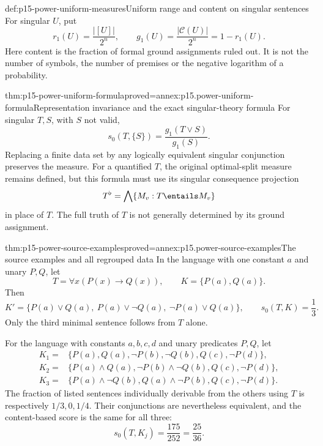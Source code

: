 \begin{hbdefinition}{def:p15-power-uniform-measures}{Uniform range and content on singular sentences}
For singular \(U\), put
\[
 r_1(U)=\frac{|[U]|}{2^n},\qquad
 g_1(U)=\frac{|\mathcal C(U)|}{2^n}=1-r_1(U).
\]
Here content is the fraction of formal ground
assignments ruled out. It is not the number
of symbols, the number of premises or the
negative logarithm of a probability.
\end{hbdefinition}

\begin{hbtheorem}{thm:p15-power-uniform-formula}{proved=annex:p15.power-uniform-formula}{Representation invariance and the exact singular-theory formula}
For singular \(T,S\), with \(S\) not valid,
\[
                  s_0(T,\{S\})
                     =\frac{g_1(T\lor S)}{g_1(S)} .
\]
Replacing a finite data set by any logically
equivalent singular conjunction preserves
the measure. For a quantified \(T\), the
original optimal-split measure remains
defined, but this formula must use its
singular consequence projection
\[
              T^\flat=\bigwedge\{M_v:T\entails M_v\}
\]
in place of \(T\). The full truth of \(T\)
is not generally determined by its ground
assignment.
\end{hbtheorem}

\begin{hbtheorem}{thm:p15-power-source-examples}{proved=annex:p15.power-source-examples}{The source examples and all regrouped data}
In the language with one constant \(a\)
and unary \(P,Q\), let
\[
                 T=\forall x(P(x)\to Q(x)),
                 \qquad K=\{P(a),Q(a)\}.
\]
Then
\[
 K'=\{P(a)\lor Q(a),\ P(a)\lor\neg Q(a),\
                              \neg P(a)\lor Q(a)\},
 \qquad s_0(T,K)=\frac13 .
\]
Only the third minimal sentence follows
from \(T\) alone.

For the language with constants \(a,b,c,d\)
and unary predicates \(P,Q\), let
\[
\begin{split}
 K_1={}&\{P(a),Q(a),\neg P(b),\neg Q(b),Q(c),\neg P(d)\},\\
 K_2={}&\{P(a)\land Q(a),\neg P(b)\land\neg Q(b),Q(c),\neg P(d)\},\\
 K_3={}&\{P(a)\land\neg Q(b),Q(a)\land\neg P(b),Q(c),\neg P(d)\}.
\end{split}
\]
The fraction of listed sentences individually
derivable from the others using \(T\) is
respectively \(1/3,0,1/4\).
Their conjunctions are nevertheless equivalent,
and the content-based score is the same
for all three:
\[
                        s_0(T,K_j)=\frac{175}{252}
                                             =\frac{25}{36}.
\]
\end{hbtheorem}

